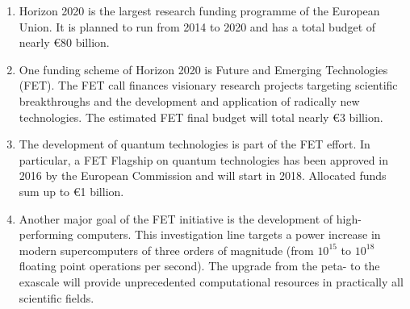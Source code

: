 \begin{enumerate}
 \item Horizon 2020 is the largest research funding programme of the European Union. It is planned to run from 2014 to 2020 and has a total budget of nearly \euro 80 billion. 
 \item One funding scheme of Horizon 2020 is Future and Emerging Technologies (FET). The FET call finances visionary research projects targeting scientific breakthroughs and the development and application of radically new technologies. The estimated FET final budget will total nearly \euro 3 billion. 
 \item The development of quantum technologies is part of the FET effort. In particular, a FET Flagship on quantum technologies has been approved in 2016 by the European Commission and will start in 2018. Allocated funds sum up to \euro 1 billion. 
 \item Another major goal of the FET initiative is the development of high-performing computers. This investigation line targets a power increase in modern supercomputers of three orders of magnitude (from $10^{15}$ to $10^{18}$ floating point operations per second). The upgrade from the peta- to the exascale will provide unprecedented computational resources in practically all scientific fields.    
\end{enumerate}